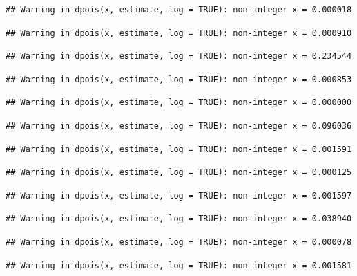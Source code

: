 \documentclass[]{article}
\begin{document}
\begin{verbatim}
## Warning in dpois(x, estimate, log = TRUE): non-integer x = 0.000018
\end{verbatim}

\begin{verbatim}
## Warning in dpois(x, estimate, log = TRUE): non-integer x = 0.000910
\end{verbatim}

\begin{verbatim}
## Warning in dpois(x, estimate, log = TRUE): non-integer x = 0.234544
\end{verbatim}

\begin{verbatim}
## Warning in dpois(x, estimate, log = TRUE): non-integer x = 0.000853
\end{verbatim}

\begin{verbatim}
## Warning in dpois(x, estimate, log = TRUE): non-integer x = 0.000000
\end{verbatim}

\begin{verbatim}
## Warning in dpois(x, estimate, log = TRUE): non-integer x = 0.096036
\end{verbatim}

\begin{verbatim}
## Warning in dpois(x, estimate, log = TRUE): non-integer x = 0.001591
\end{verbatim}

\begin{verbatim}
## Warning in dpois(x, estimate, log = TRUE): non-integer x = 0.000125
\end{verbatim}

\begin{verbatim}
## Warning in dpois(x, estimate, log = TRUE): non-integer x = 0.001597
\end{verbatim}

\begin{verbatim}
## Warning in dpois(x, estimate, log = TRUE): non-integer x = 0.038940
\end{verbatim}

\begin{verbatim}
## Warning in dpois(x, estimate, log = TRUE): non-integer x = 0.000078
\end{verbatim}

\begin{verbatim}
## Warning in dpois(x, estimate, log = TRUE): non-integer x = 0.001581
\end{verbatim}
\end{document}
